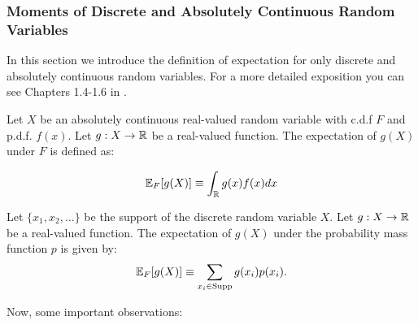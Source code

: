 \documentclass[11pt]{article} %
\begin{document}
\subsubsection{Moments of Discrete and Absolutely Continuous Random Variables}
In this section we introduce the definition of expectation for only discrete and absolutely continuous random variables. For a more detailed exposition you can see Chapters 1.4-1.6 in \cite{durrett2010}.

\begin{definition} Let $X$ be an absolutely continuous real-valued random variable with c.d.f $F$ and p.d.f. $f(x)$. Let $g:X \rightarrow \mathbb{R}$ be a real-valued function. The expectation of $g(X)$ under $F$ is defined as:

$$\mathbb{E}_{F}[g(X)] \equiv \int_{\mathbb{R}} g(x)f(x)dx  $$



\end{definition}
 
 \begin{definition} Let $\{x_1, x_2, \ldots\}$ be the support of the discrete random variable $X$. Let $g:X \rightarrow \mathbb{R}$ be a real-valued function. The expectation of $g(X)$ under the probability mass function $p$ is given by:
 $$\mathbb{E}_{F}[g(X)] \equiv \sum_{x_i \in \text{Supp}} g(x_i) p(x_i).   $$
 \noindent  
 \end{definition}
 
 \noindent Now, some important observations:
 
\end{document}
